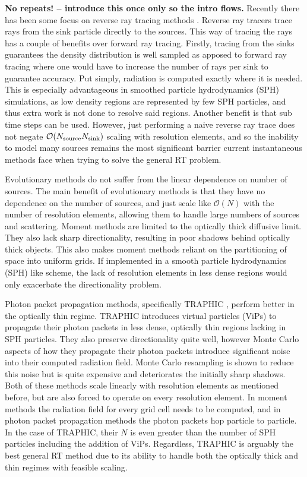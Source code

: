 \documentclass[fleqn,usenatbib]{mnras}
\begin{document}
{\bf No repeats! -- introduce this once only so the intro flows.}
Recently there has been some focus on reverse ray tracing methods 
\citep{clarkEt12, altayTheuns13}. Reverse ray tracers trace rays from the sink 
particle directly to the sources. This way of tracing the rays has a couple of 
benefits over forward ray tracing. Firstly, tracing from the sinks guarantees 
the density distribution is well sampled as apposed to forward ray tracing 
where one would have to increase the number of rays per sink to guarantee 
accuracy. Put simply, radiation is computed exactly where it is needed. This 
is especially advantageous in smoothed particle hydrodynamics (SPH) 
simulations, as low density regions are represented by few SPH particles, and 
thus extra work is not done to resolve said regions. Another benefit is that 
sub time steps can be used. However, just performing a naive reverse ray trace 
does not negate $\mathcal{O}(N_{\rm source} N_{\rm sink})$ scaling with 
resolution elements, and so the inability to model many sources remains the 
most significant barrier current instantaneous methods face when trying to 
solve the general RT problem.

Evolutionary methods do not suffer from the linear dependence on number of 
sources. The main benefit of evolutionary methods is that they have no 
dependence on the number of sources, and just scale like $\mathcal{O}(N)$ with
the number of resolution elements, allowing them to handle large numbers of 
sources and scattering. Moment methods are limited to the optically thick 
diffusive limit. They also lack sharp directionality, resulting in poor shadows
behind optically thick objects. This also makes moment methods reliant on the 
partitioning of space into uniform grids. If implemented in a smooth particle 
hydrodynamics (SPH) like scheme, the lack of resolution elements in less dense 
regions would only exacerbate the directionality problem. 

Photon packet propagation methods, specifically TRAPHIC \citep{pawlikSchaye08},
 perform better in the optically thin regime. TRAPHIC introduces virtual 
particles (ViPs) to propagate their photon packets in less dense, optically 
thin regions lacking in SPH particles. They also preserve directionality quite 
well, however Monte Carlo aspects of how they propagate their photon packets 
introduce significant noise into their computed radiation field. Monte Carlo
 resampling is shown to reduce this noise but is quite expensive and 
deteriorates the initially sharp shadows. Both of these methods scale linearly 
with resolution elements as mentioned before, but are also forced to operate on
 every resolution element. In moment methods the radiation field for every 
grid cell needs to be computed, and in photon packet propagation methods the 
photon packets hop particle to particle. In the case of TRAPHIC, their $N$ is 
even greater than the number of SPH particles including the addition of ViPs. 
Regardless, TRAPHIC is arguably the best general RT method due to its ability 
to handle both the optically thick and thin regimes with feasible scaling.
\end{document}
